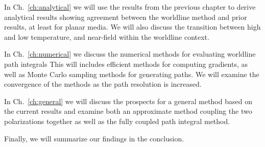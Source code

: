 In Ch.~\ref{ch:analytical} we will use the results from the previous chapter to derive analytical 
results showing agreement between the worldline method and prior results, at least for planar media.
We will also discuss the transition between high and low temperature, and near-field within the
worldline context.  

In Ch.~\ref{ch:numerical} we discuss the numerical methods for evaluating worldline path integrals
This will includes efficient methods for computing gradients, as well as Monte Carlo sampling methods
for generating paths.  We will examine the convergence of the methods as the path resolution is increased.

In Ch.~\ref{ch:general} we will discuss the prospects for a general method based on the current
results and examine both an approximate method coupling the two polarizations together as well
as the fully coupled path integral method.  %

Finally, we will summarize our findings in the conclusion.  




